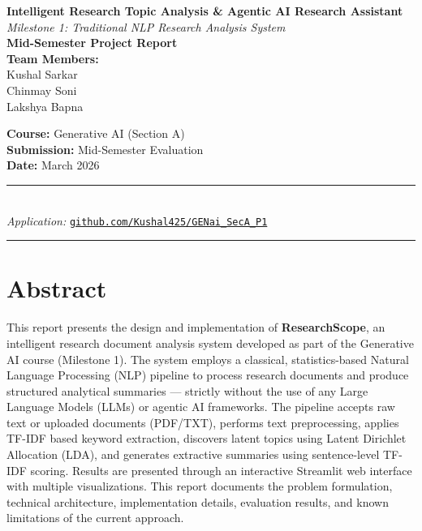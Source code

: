 \documentclass[12pt, a4paper]{article}
\begin{document}
\begin{titlepage}
  \centering
  \vspace*{1.5cm}

  {\LARGE \textbf{Intelligent Research Topic Analysis \& Agentic AI Research Assistant}}\\[0.5cm]
  {\large \textit{Milestone 1: Traditional NLP Research Analysis System}}\\[0.3cm]
  {\large \textbf{Mid-Semester Project Report}}\\[2cm]

  {\large
    \textbf{Team Members:}\\[0.3cm]
    Kushal Sarkar\\
    Chinmay Soni\\
    Lakshya Bapna\\[1.5cm]
  }

  {\large
    \textbf{Course:} Generative AI (Section A)\\[0.2cm]
    \textbf{Submission:} Mid-Semester Evaluation\\[0.2cm]
    \textbf{Date:} March 2026\\[2cm]
  }

  \rule{\linewidth}{0.5pt}\\[0.5cm]
  {\large \textit{Application:} \href{https://github.com/Kushal425/GENai_SecA_P1}{\texttt{github.com/Kushal425/GENai\_SecA\_P1}}}\\[0.3cm]
  \rule{\linewidth}{0.5pt}

  \vfill
\end{titlepage}

\tableofcontents
\newpage

\section{Abstract}

This report presents the design and implementation of \textbf{ResearchScope}, an intelligent research document analysis system developed as part of the Generative AI course (Milestone 1). The system employs a classical, statistics-based Natural Language Processing (NLP) pipeline to process research documents and produce structured analytical summaries — strictly without the use of any Large Language Models (LLMs) or agentic AI frameworks. The pipeline accepts raw text or uploaded documents (PDF/TXT), performs text preprocessing, applies TF-IDF based keyword extraction, discovers latent topics using Latent Dirichlet Allocation (LDA), and generates extractive summaries using sentence-level TF-IDF scoring. Results are presented through an interactive Streamlit web interface with multiple visualizations. This report documents the problem formulation, technical architecture, implementation details, evaluation results, and known limitations of the current approach.
\end{document}
